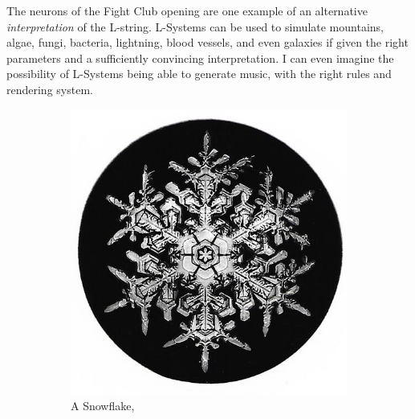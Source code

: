 \documentclass[12pt,twoside]{reedthesis}
\begin{document}
	
	The neurons of the Fight Club opening are one example of an alternative \textit{interpretation} of the L-string. L-Systems can be used to simulate mountains, algae, fungi, bacteria, lightning, blood vessels, and even galaxies if given the right parameters and a sufficiently convincing interpretation. I can even imagine the possibility of L-Systems being able to generate music, with the right rules and rendering system.
	
	
	\begin{figure}[h]
	\centering
	\begin{subfigure}{0.44\linewidth}
		\centering
		\includegraphics[width=\linewidth]{Images/Snowflake2}
		\caption{A Snowflake, \cite{bentley}}
		\label{Snowflake}
	\end{subfigure}%
	\hfill
	\begin{subfigure}{0.52\linewidth}
		\centering

\end{subfigure}
\end{figure}
\end{document}
